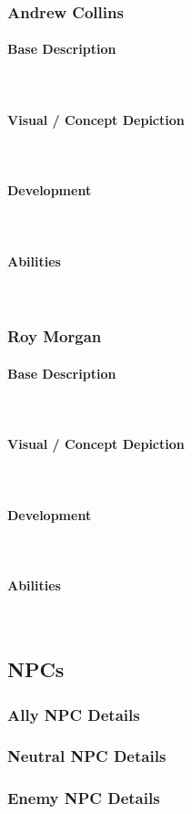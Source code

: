         \subsubsection{Andrew Collins}
            \paragraph{Base Description}\mbox{}\\
            \paragraph{Visual / Concept Depiction}\mbox{}\\
            \paragraph{Development}\mbox{}\\
            \paragraph{Abilities}\mbox{}\\
        \subsubsection{Roy Morgan}
            \paragraph{Base Description}\mbox{}\\
            \paragraph{Visual / Concept Depiction}\mbox{}\\
            \paragraph{Development}\mbox{}\\
            \paragraph{Abilities}\mbox{}\\
    \subsection{NPCs}
        \subsubsection{Ally NPC Details}
        \subsubsection{Neutral NPC Details}
        \subsubsection{Enemy NPC Details}